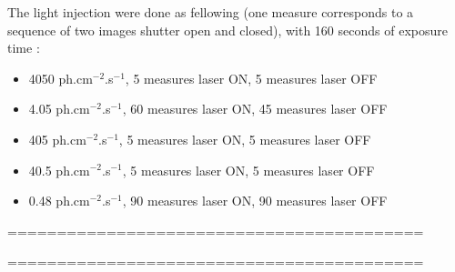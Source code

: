 \documentclass{article}
\begin{document}
The light injection were done as fellowing (one measure corresponds to a sequence of two images shutter open and closed), with 160 seconds of exposure time : 
\begin{itemize}
	\item  4050 ph.cm$^{-2}$.s$^{-1}$, 5 measures laser ON, 5 measures laser OFF
	\item  4.05 ph.cm$^{-2}$.s$^{-1}$, 60 measures laser ON, 45 measures laser OFF
	\item  405 ph.cm$^{-2}$.s$^{-1}$, 5 measures laser ON, 5 measures laser OFF
	\item  40.5 ph.cm$^{-2}$.s$^{-1}$, 5 measures laser ON, 5 measures laser OFF
	\item  0.48 ph.cm$^{-2}$.s$^{-1}$, 90 measures laser ON, 90 measures laser OFF
\end{itemize}



==========================================

==========================================
\end{document}
